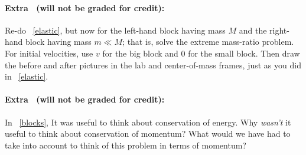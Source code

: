 \documentclass[12pt]{article}
\begin{document}
\paragraph{Extra \problemname\ (will not be graded for credit):}%
Re-do \problemname~\ref{elastic}, but now for the left-hand block having
mass $M$ and the right-hand block having mass $m\ll M$; that is, solve
the extreme mass-ratio problem. For initial velocities, use $v$ for
the big block and $0$ for the small block. Then draw the before and
after pictures in the lab and center-of-mass frames, just as you did
in \problemname~\ref{elastic}.

\paragraph{Extra \problemname\ (will not be graded for credit):}%
In \problemname~\ref{blocks}, It was useful to think about
conservation of energy. Why \emph{wasn't} it useful to think about
conservation of momentum? What would we have had to take into account
to think of this problem in terms of momentum?
\end{document}
